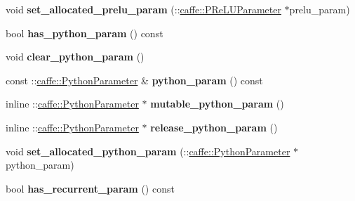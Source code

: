 \begin{DoxyCompactItemize}
\mbox{\label{classcaffe_1_1_layer_parameter_aeb4be95f66c78a3245abd23ab583f7b8}} 
void {\bfseries set\+\_\+allocated\+\_\+prelu\+\_\+param} (\+::\mbox{\hyperlink{classcaffe_1_1_p_re_l_u_parameter}{caffe\+::\+P\+Re\+L\+U\+Parameter}} $\ast$prelu\+\_\+param)
\item 
\mbox{\label{classcaffe_1_1_layer_parameter_a002650bcb2ff05646e11c39e365ec846}} 
bool {\bfseries has\+\_\+python\+\_\+param} () const
\item 
\mbox{\label{classcaffe_1_1_layer_parameter_afed332cb15911c727a8ba14f1890112e}} 
void {\bfseries clear\+\_\+python\+\_\+param} ()
\item 
\mbox{\label{classcaffe_1_1_layer_parameter_ad94be8d28f6232b88448255ace921810}} 
const \+::\mbox{\hyperlink{classcaffe_1_1_python_parameter}{caffe\+::\+Python\+Parameter}} \& {\bfseries python\+\_\+param} () const
\item 
\mbox{\label{classcaffe_1_1_layer_parameter_a9165ed067d4107b5c510ff034526602c}} 
inline \+::\mbox{\hyperlink{classcaffe_1_1_python_parameter}{caffe\+::\+Python\+Parameter}} $\ast$ {\bfseries mutable\+\_\+python\+\_\+param} ()
\item 
\mbox{\label{classcaffe_1_1_layer_parameter_a8c0700f7bdb62880350da246858a53f8}} 
inline \+::\mbox{\hyperlink{classcaffe_1_1_python_parameter}{caffe\+::\+Python\+Parameter}} $\ast$ {\bfseries release\+\_\+python\+\_\+param} ()
\item 
\mbox{\label{classcaffe_1_1_layer_parameter_acacf6d53847d0291fbe97f2a3c883aa0}} 
void {\bfseries set\+\_\+allocated\+\_\+python\+\_\+param} (\+::\mbox{\hyperlink{classcaffe_1_1_python_parameter}{caffe\+::\+Python\+Parameter}} $\ast$python\+\_\+param)
\item 
\mbox{\label{classcaffe_1_1_layer_parameter_a9ef337a844db8e5970fe4fc3929318ba}} 
bool {\bfseries has\+\_\+recurrent\+\_\+param} () const
\item 
\mbox{\label{classcaffe_1_1_layer_parameter_a0b77d9e4d95c47d3799dc81ba3f44c61}} 

\end{DoxyCompactItemize}
